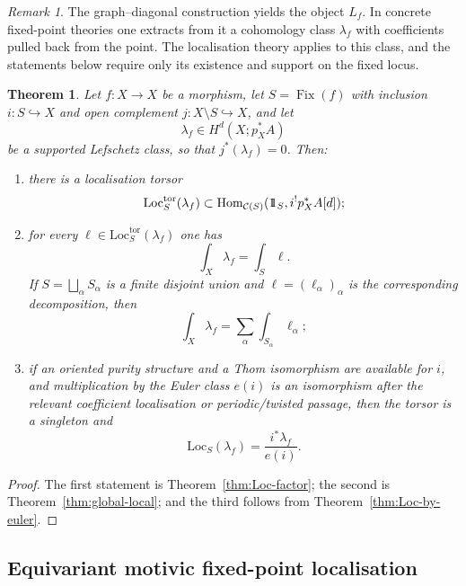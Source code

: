 \documentclass[10pt,a4paper,dvipsnames,x11names]{amsart}
\newcommand{\one}{1\hskip-3.5pt1}
\newcommand{\C}{\mathcal C}
\newcommand{\Hom}{\mathrm{Hom}}
\newcommand{\Loc}{\mathrm{Loc}}
\providecommand{\Fix}{\operatorname{Fix}}
\numberwithin{equation}{section}
\theoremstyle{plain}
\newtheorem{theorem}{Theorem}[section]
\theoremstyle{definition}
\theoremstyle{remark}
\newtheorem{remark}[remark]{Remark}
\begin{document}
\begin{remark}
The graph--diagonal construction yields the object $L_f$. In concrete fixed-point theories one extracts from it a cohomology class $\lambda_f$ with coefficients pulled back from the point. The localisation theory applies to this class, and the statements below require only its existence and support on the fixed locus.
\end{remark}

\begin{theorem}\label{thm:Lefschetz-formal}
Let $f:X\to X$ be a morphism, let $S=\Fix(f)$ with inclusion $i:S\hookrightarrow X$ and open complement $j:X\setminus S\hookrightarrow X$, and let
\[
\lambda_f\in H^d(X;p_X^*A)
\]
be a supported Lefschetz class, so that $j^*(\lambda_f)=0$.  Then:
\begin{enumerate}
\item there is a localisation torsor
\[
\Loc_S^{\mathrm{tor}}(\lambda_f)
\subset
\Hom_{\C(S)}(\one_S,i^!p_X^*A[d]);
\]
\item for every $\ell\in\Loc_S^{\mathrm{tor}}(\lambda_f)$ one has
\[
\int_X\lambda_f=\int_S\ell.
\]
If $S=\bigsqcup_\alpha S_\alpha$ is a finite disjoint union and $\ell=(\ell_\alpha)_\alpha$ is the corresponding decomposition, then
\[
\int_X\lambda_f=\sum_\alpha\int_{S_\alpha}\ell_\alpha;
\]
\item if an oriented purity structure and a Thom isomorphism are available for $i$, and multiplication by the Euler class $e(i)$ is an isomorphism after the relevant coefficient localisation or periodic/twisted passage, then the torsor is a singleton and
\[
\Loc_S(\lambda_f)=\frac{i^*\lambda_f}{e(i)}.
\]
\end{enumerate}
\end{theorem}

\begin{proof}
The first statement is Theorem~\ref{thm:Loc-factor}; the second is Theorem~\ref{thm:global-local}; and the third follows from Theorem~\ref{thm:Loc-by-euler}.
\end{proof}
\subsection{Equivariant motivic fixed-point localisation}
\end{document}
